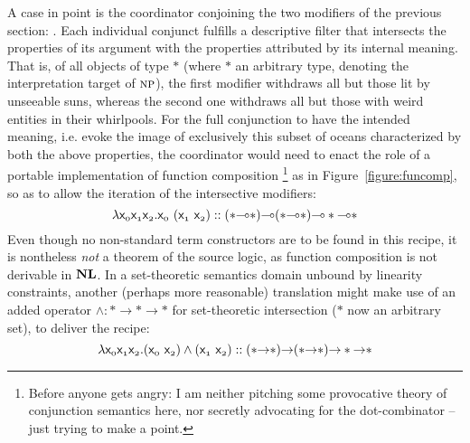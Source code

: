 A case in point is the coordinator  conjoining the two modifiers of the previous section: .
Each individual conjunct fulfills a descriptive filter that intersects the properties of its argument with the properties attributed by its internal meaning.
That is, of all objects of type $*$ (where $*$ an arbitrary type, denoting the interpretation target of $\normalfont\textsc{np}$), the first modifier withdraws all but those lit by unseeable suns, whereas the second one withdraws all but those with weird entities in their whirlpools.
For the full conjunction to have the intended meaning, i.e. evoke the image of exclusively this subset of oceans characterized by both the above properties, the coordinator would need to enact the role of a portable implementation of function composition%
	\footnote{Before anyone gets angry: I am neither pitching some provocative theory of conjunction semantics here,  nor secretly advocating for the dot-combinator -- just trying to make a point.} 
as in Figure~\ref{figure:funcomp}, so as to allow the iteration of the intersective modifiers:
\begin{equation}\label{equation:funcomp}
\lam \smallterm{\Var{0}\Var{1}\Var{2}.\Var{0}~(\Var{1}~\Var{2})} :: (*\li *)\li(*\li *)\li * \li *
\end{equation}
Even though no non-standard term constructors are to be found in this recipe, it is nontheless \textit{not} a theorem of the source logic, as function composition is not derivable in $\textbf{NL}$.
In a set-theoretic semantics domain unbound by linearity constraints, another (perhaps more reasonable) translation might make use of an added operator $\wedge : * \to * \to *$ for set-theoretic intersection ($*$ now an arbitrary set), to deliver the recipe:
\begin{equation}
\lam \smallterm{\Var{0}\Var{1}\Var{2}.(\Var{0}~\Var{2})\wedge(\Var{1}~\Var{2})} :: (*\ii *)\ii(*\ii *)\ii * \ii *
\end{equation}

